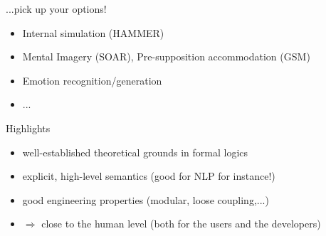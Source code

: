 \documentclass[compress]{beamer}
\begin{document}
\begin{frame}{...pick up your options!}

    \begin{itemize}
        \item Internal simulation (HAMMER)
        \item Mental Imagery (SOAR), Pre-supposition accommodation (GSM)
        \item Emotion recognition/generation
        \item ...
    \end{itemize}
\end{frame}


\begin{frame}{Highlights}

    \begin{itemize}
        \item {\Medium well-established theoretical grounds} in formal logics
        \item {\Medium explicit}, {\Medium high-level semantics} (good for NLP for instance!)
        \item good engineering properties (modular, loose coupling,...)
        \item $\Rightarrow$ {\Medium close to the human level} (both for the users and the developers)
    \end{itemize}
    


\end{frame}
\end{document}
